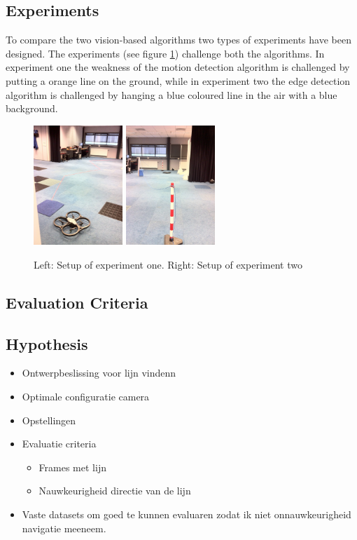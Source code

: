 \documentclass[a4paper]{article}
\begin{document}
\subsection{Experiments}
To compare the two vision-based algorithms two types of experiments have been designed. The experiments (see figure \ref{experiments}) challenge both the algorithms. In experiment one the weakness of the motion detection algorithm is challenged by putting a orange line on the ground, while in experiment two the edge detection algorithm is challenged by hanging a blue coloured line in the air with a blue background.
\begin{figure}
\centering
\includegraphics[width=0.3\textwidth]{images/experiment1.jpg}
\includegraphics[width=0.3\textwidth]{images/experiment2.jpg}
\caption{Left: Setup of experiment one. Right: Setup of experiment two}
\label{experiments}
\end{figure}
\subsection{Evaluation Criteria}

\subsection{Hypothesis}
\begin{itemize}
\item Ontwerpbeslissing voor lijn vindenn
\item Optimale configuratie camera
\item Opstellingen
\item Evaluatie criteria
\begin{itemize}
\item Frames met lijn
\item Nauwkeurigheid directie van de lijn
\end{itemize}
\item Vaste datasets om goed te kunnen evaluaren zodat ik niet onnauwkeurigheid navigatie meeneem.
\end{itemize}
\end{document}
